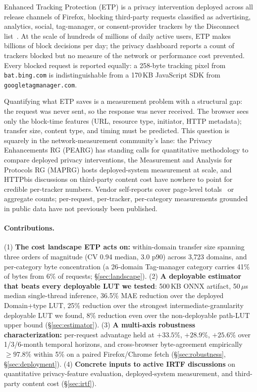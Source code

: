 \documentclass[10pt,sigconf,letterpaper,anonymous]{acmart}
\newcommand{\numdomains}{3{,}723\xspace}
\begin{document}
Enhanced Tracking Protection (ETP) is a privacy intervention deployed across all release channels of Firefox, blocking third-party requests classified as advertising, analytics, social, tag-manager, or consent-provider trackers by the Disconnect list~\cite{disconnectlist}.
At the scale of hundreds of millions of daily active users, ETP makes billions of block decisions per day; the privacy dashboard reports a count of trackers blocked but no measure of the network or performance cost prevented.
Every blocked request is reported equally: a 258-byte tracking pixel from \texttt{bat.bing.com} is indistinguishable from a 170\,KB JavaScript SDK from \texttt{googletagmanager.com}.

Quantifying what ETP saves is a measurement problem with a structural gap: the request was never sent, so the response was never received. The browser sees only the block-time features (URL, resource type, initiator, HTTP metadata); transfer size, content type, and timing must be predicted. This question is squarely in the network-measurement community's lane: the Privacy Enhancements RG (PEARG) has standing calls for quantitative methodology to compare deployed privacy interventions, the Measurement and Analysis for Protocols RG (MAPRG) hosts deployed-system measurement at scale, and HTTPbis discussions on third-party content cost have nowhere to point for credible per-tracker numbers. Vendor self-reports cover page-level totals~\cite{brave2019savings} or aggregate counts; per-request, per-tracker, per-category measurements grounded in public data have not previously been published.

\paragraph{Contributions.}
(1) \textbf{The cost landscape ETP acts on:} within-domain transfer size spanning three orders of magnitude (CV 0.94 median, 3.0 p90) across \numdomains domains, and per-category byte concentration (a 26-domain Tag-manager category carries 41\% of bytes from 6\% of requests; \S\ref{sec:landscape}).
(2) \textbf{A deployable estimator that beats every deployable LUT we tested}: 500\,KB ONNX artifact, 50\,$\mu$s median single-thread inference, 36.5\% MAE reduction over the deployed Domain+type LUT, 25\% reduction over the strongest intermediate-granularity deployable LUT we found, 8\% reduction even over the non-deployable path-LUT upper bound (\S\ref{sec:estimator}).
(3) \textbf{A multi-axis robustness characterization:} per-request advantage held at $+33.5\%$, $+28.9\%$, $+25.6\%$ over 1/3/6-month temporal horizons, and cross-browser byte-agreement empirically $\geq 97.8\%$ within 5\% on a paired Firefox/Chrome fetch (\S\ref{sec:robustness}, \S\ref{sec:deployment}).
(4) \textbf{Concrete inputs to active IRTF discussions} on quantitative privacy-feature evaluation, deployed-system measurement, and third-party content cost (\S\ref{sec:irtf}).
\end{document}
